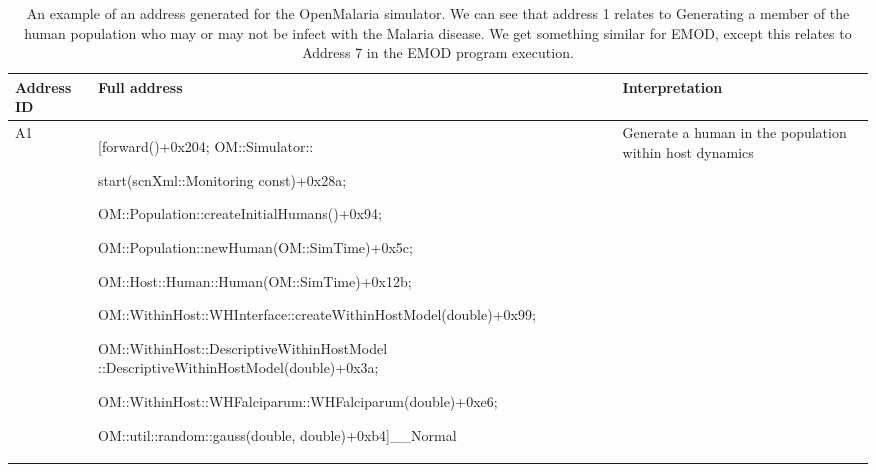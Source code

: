 \documentclass{article}
\begin{document}
 \begin{table}[h!]
  \footnotesize
  \setlength{\tabcolsep}{1mm}
  \caption{An example of an address generated for the OpenMalaria simulator. We can see that address 1
  relates to Generating a member of the human population who may or may not be infect with the Malaria disease. We get something similar for EMOD, except this relates to Address 7 in the EMOD program execution.}
  \label{table:addresses}
  \def\arraystretch{1.25}
  \begin{tabularx}{\textwidth}{@{}lX@{}l@{}} 
    \toprule
    Address ID & Full address & Interpretation\\
    \midrule
  A1 & [forward()+0x204; OM::Simulator::

  start(scnXml::Monitoring const)+0x28a;

  OM::Population::createInitialHumans()+0x94;

  OM::Population::newHuman(OM::SimTime)+0x5c;

  OM::Host::Human::Human(OM::SimTime)+0x12b;

  OM::WithinHost::WHInterface::createWithinHostModel(double)+0x99;

  OM::WithinHost::DescriptiveWithinHostModel
  ::DescriptiveWithinHostModel(double)+0x3a;

  OM::WithinHost::WHFalciparum::WHFalciparum(double)+0xe6;

  OM::util::random::gauss(double, double)+0xb4]\_\_Normal &  Generate a human in the population within host dynamics \\









\bottomrule
  \end{tabularx}
  \end{table}



\end{document}
